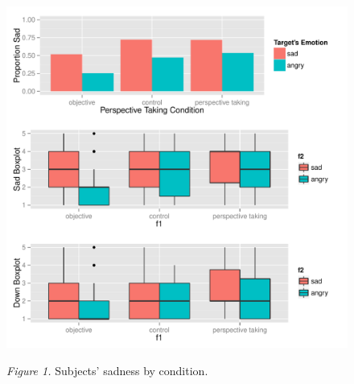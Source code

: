 \documentclass[man,a4paper,noextraspace,apacite]{apa6}\usepackage[]{graphicx}\usepackage[]{color}
\makeatletter
\def\maxwidth{ %
  \ifdim\Gin@nat@width>\linewidth
    \linewidth
  \else
    \Gin@nat@width
  \fi
}
\newenvironment{knitrout}{}{} %
\makeatother
\begin{document}
\begin{figure}
\begin{knitrout}
\color{fgcolor}
\includegraphics[width=\maxwidth]{figure/SadPlot} 

\end{knitrout}
\textit{Figure 1.} Subjects' sadness by condition.
\end{figure}
\end{document}
